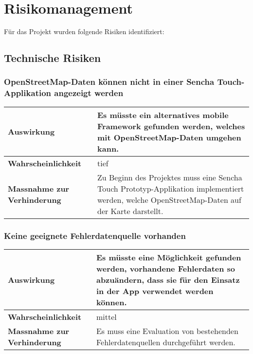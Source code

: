 \section{Risikomanagement}
\label{risikomanagement}

Für das Projekt wurden folgende Risiken identifiziert:
\subsection{Technische Risiken}

\subsubsection{OpenStreetMap-Daten können nicht in einer Sencha Touch-Applikation angezeigt werden}
\begin{table}[H]
\centering
\begin{tabular}{|p{0.25\twocelltabwidth}|p{0.75\twocelltabwidth}|}
\hline 
\small{\textbf{Auswirkung}} & Es müsste ein alternatives mobile Framework gefunden werden, welches mit \gls{OpenStreetMap}-Daten umgehen kann. \\
\hline 
\small{\textbf{Wahrscheinlichkeit}} & tief \\
\hline 
\small{\textbf{Massnahme zur Verhinderung}} & Zu Beginn des Projektes muss eine Sencha Touch Prototyp-Applikation implementiert werden, welche \gls{OpenStreetMap}-Daten auf der Karte darstellt. \\
\hline
\end{tabular}
\end{table}

\subsubsection{Keine geeignete Fehlerdatenquelle vorhanden}
\begin{table}[H]
\centering
\begin{tabular}{|p{0.25\twocelltabwidth}|p{0.75\twocelltabwidth}|}
\hline 
\small{\textbf{Auswirkung}} & Es müsste eine Möglichkeit gefunden werden, vorhandene Fehlerdaten so abzuändern, dass sie für den Einsatz in der App verwendet werden können. \\
\hline 
\small{\textbf{Wahrscheinlichkeit}} & mittel \\
\hline 
\small{\textbf{Massnahme zur Verhinderung}} & Es muss eine Evaluation von bestehenden Fehlerdatenquellen durchgeführt werden. \\
\hline
\end{tabular}
\end{table}

